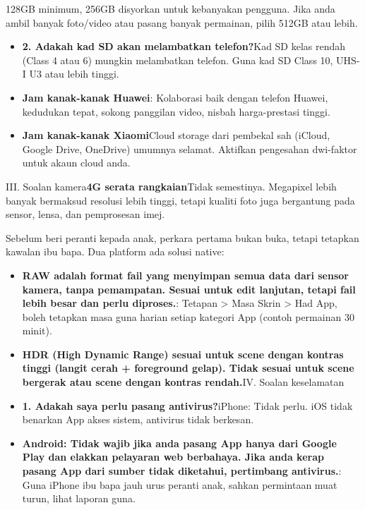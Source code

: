 
128GB minimum, 256GB disyorkan untuk kebanyakan pengguna. Jika anda ambil banyak foto/video atau pasang banyak permainan, pilih 512GB atau lebih.

\begin{itemize}
  \item \textbf{2. Adakah kad SD akan melambatkan telefon?}Kad SD kelas rendah (Class 4 atau 6) mungkin melambatkan telefon. Guna kad SD Class 10, UHS-I U3 atau lebih tinggi.
  \item \textbf{Jam kanak-kanak Huawei}: Kolaborasi baik dengan telefon Huawei, kedudukan tepat, sokong panggilan video, nisbah harga-prestasi tinggi.
  \item \textbf{Jam kanak-kanak Xiaomi}Cloud storage dari pembekal sah (iCloud, Google Drive, OneDrive) umumnya selamat. Aktifkan pengesahan dwi-faktor untuk akaun cloud anda.
\end{itemize}

III. Soalan kamera\textbf{4G serata rangkaian}Tidak semestinya. Megapixel lebih banyak bermaksud resolusi lebih tinggi, tetapi kualiti foto juga bergantung pada sensor, lensa, dan pemprosesan imej.


Sebelum beri peranti kepada anak, perkara pertama bukan buka, tetapi tetapkan kawalan ibu bapa. Dua platform ada solusi native:


\begin{itemize}
  \item \textbf{RAW adalah format fail yang menyimpan semua data dari sensor kamera, tanpa pemampatan. Sesuai untuk edit lanjutan, tetapi fail lebih besar dan perlu diproses.}: Tetapan > Masa Skrin > Had App, boleh tetapkan masa guna harian setiap kategori App (contoh permainan 30 minit).
  \item \textbf{HDR (High Dynamic Range) sesuai untuk scene dengan kontras tinggi (langit cerah + foreground gelap). Tidak sesuai untuk scene bergerak atau scene dengan kontras rendah.}IV. Soalan keselamatan
  \item \textbf{1. Adakah saya perlu pasang antivirus?}iPhone: Tidak perlu. iOS tidak benarkan App akses sistem, antivirus tidak berkesan.
  \item \textbf{Android: Tidak wajib jika anda pasang App hanya dari Google Play dan elakkan pelayaran web berbahaya. Jika anda kerap pasang App dari sumber tidak diketahui, pertimbang antivirus.}: Guna iPhone ibu bapa jauh urus peranti anak, sahkan permintaan muat turun, lihat laporan guna.
\end{itemize}

